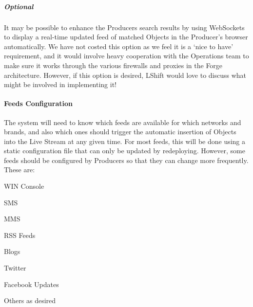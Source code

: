 \documentclass[a4paper, 11pt]{scrreprt}
\begin{document}
\subparagraph{Optional}
\label{h.j2a62rbkm76w}
It may be possible to enhance the Producers search results by using WebSockets to display a real-time updated feed of matched Objects in the Producer’s browser automatically. We have not costed this option as we feel it is a ‘nice to have’ requirement, and it would involve heavy cooperation with the Operations team to make sure it works through the various firewalls and proxies in the Forge architecture. However, if this option is desired, LShift would love to discuss what might be involved in implementing it!


\paragraph{Feeds Configuration}
The system will need to know which feeds are available for which networks and brands, and also which ones should trigger the automatic insertion of Objects into the Live Stream at any given time. For most feeds, this will be done using a static configuration file that can only be updated by redeploying. However, some feeds should be configured by Producers so that they can change more frequently. These are:



\begin{tystrul}


\item WIN Console

\begin{tystrul}


\item SMS

\item MMS

\end{tystrul}



\item RSS Feeds

\begin{tystrul}


\item Blogs

\item Twitter

\item Facebook Updates

\item Others as desired

\end{tystrul}



\end{tystrul}
\end{document}
